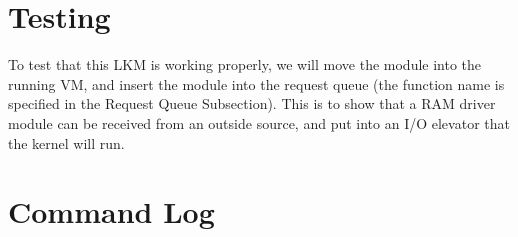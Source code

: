 \documentclass[onecolumn, draftclsnofoot,10pt, compsoc]{IEEEtran}
\begin{document}
	
	\section{Testing}
        To test that this LKM is working properly, we will move the module into the running VM, and insert the module into the request queue (the function name is specified in the Request Queue Subsection). This is to show that a RAM driver module can be received from an outside source, and put into an I/O elevator that the kernel will run.
	\section{Command Log}

    
    
        
\end{document}
